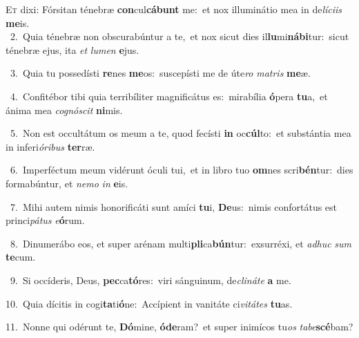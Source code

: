 \lettrine{\initial\textcolor{\initialcolor}{E}}{t} dixi: Fórsitan ténebræ \textbf{con}\-cul\-\textbf{cá}\-\textbf{bunt} me:~\star et nox illuminátio mea in de\-\textit{lí}\-\textit{ci}\textit{is} \textbf{me}\-is.\\
{\numbfont\textcolor{\numbcolor}{~2.}}~Quia ténebræ non obscurabúntur a te,~\dagger et nox sicut dies il\-\textbf{lu}\-mi\-\textbf{ná}\-\textbf{bi}tur:~\star sicut ténebræ ejus, ita \textit{et} \textit{lu}\-\textit{men} \textbf{e}\-jus.\par
{\numbfont\textcolor{\numbcolor}{~3.}}~Quia tu possedísti \textbf{re}\-nes \textbf{me}\-os:~\star suscepísti me de úte\textit{ro} \textit{ma}\-\textit{tris} \textbf{me}\-æ.\par
{\numbfont\textcolor{\numbcolor}{~4.}}~Confitébor tibi quia terribíliter magnificátus es:~\dagger mirabília \textbf{ó}\-pera \textbf{tu}\-a,~\star et ánima mea \textit{co}\-\textit{gnó}\textit{scit} \textbf{ni}\-mis.\par
{\numbfont\textcolor{\numbcolor}{~5.}}~Non est occultátum os meum a te, quod fecísti \textbf{in} oc\-\textbf{cúl}\-to:~\star et substántia mea in inferi\-\textit{ó}\-\textit{ri}\textit{bus} \textbf{ter}\-ræ.\par
{\numbfont\textcolor{\numbcolor}{~6.}}~Imperféctum meum vidérunt óculi tui,~\dagger et in libro tuo \textbf{om}\-nes scri\-\textbf{bén}\-tur:~\star dies formabúntur, et \textit{ne}\-\textit{mo} \textit{in} \textbf{e}\-is.\par
{\numbfont\textcolor{\numbcolor}{~7.}}~Mihi autem nimis honorificáti sunt amíci \textbf{tu}\-i, \textbf{De}\-us:~\star nimis confortátus est princi\-\textit{pá}\-\textit{tus} \textit{e}\-\textbf{ó}rum.\par
{\numbfont\textcolor{\numbcolor}{~8.}}~Dinumerábo eos, et super arénam multi\-\textbf{pli}\-ca\-\textbf{bún}\-tur:~\star exsurréxi, et \textit{ad}\-\textit{huc} \textit{sum} \textbf{te}\-cum.\par
{\numbfont\textcolor{\numbcolor}{~9.}}~Si occíderis, Deus, \textbf{pec}\-ca\-\textbf{tó}\-res:~\star viri sánguinum, de\-\textit{cli}\-\textit{ná}\textit{te} \textbf{a} me.\par
{\numbfont\textcolor{\numbcolor}{10.}}~Quia dícitis in cogi\-\textbf{ta}\-ti\-\textbf{ó}\-ne:~\star Accípient in vanitáte ci\-\textit{vi}\-\textit{tá}\textit{tes} \textbf{tu}\-as.\par
{\numbfont\textcolor{\numbcolor}{11.}}~Nonne qui odérunt te, \textbf{Dó}\-mine, \textbf{ó}\-\textbf{de}ram?~\star et super inimícos tu\textit{os} \textit{ta}\-\textit{be}\textbf{scé}bam?\par
